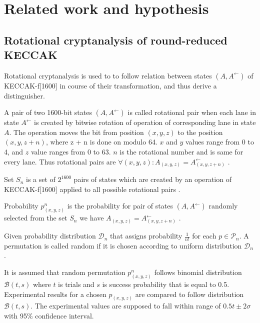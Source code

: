 \chapter{Related work and hypothesis}

\section{Rotational cryptanalysis of round-reduced KECCAK}

Rotational cryptanalysis\cite{00041} is used to to follow relation between states $(A, A^{\leftarrow})$ of 
KECCAK-f[1600] in course of their transformation, and thus derive a distinguisher.

\begin{defn}
A pair of two 1600-bit states $(A, A^{\leftarrow})$ is called rotational pair when each lane in state $A^{\leftarrow}$
is created by bitwise rotation of operation of corresponding lane in state $A$. The operation moves the bit from 
position $(x, y, z)$ to the position $(x, y, z + n)$, where z + n is done on modulo 64. $x$ and $y$ values range from 0 
to 4, and $z$ value ranges from 0 to 63. $n$ is the rotational number and is same for every lane. Thus rotational pairs
are $\forall(x, y, z) : A_{(x, y, z)} = A^{\leftarrow}_{(x, y, z + n)}$ \cite{00022}.
\end{defn}

\begin{defn}
Set $S_n$ is a set of $2^{1600}$ pairs of states which are created by an operation of KECCAK-f[1600] applied to all
possible rotational pairs \cite{00022}.
\end{defn}

\begin{defn}
Probability $p^{n}_{(x, y, z)}$ is the probability for pair of states $(A, A^{\leftarrow})$ randomly selected from the
set $S_n$ we have $A_{(x, y, z)} = A^{\leftarrow}_{(x, y, z + n)}$ \cite{00022}.
\end{defn}

\begin{defn}
Given probability distribution $\mathcal{D}_n$ that assigns probability $\frac{1}{n!}$ for each $p \in \mathcal{P}_n$.
A permutation is called random if it is chosen according to uniform distribution $\mathcal{D}_n$ \cite{00022}.
\end{defn}

It is assumed that random permutation $p^n_{(x, y, z)}$ follows binomial distribution $\mathcal{B}(t, s)$ where $t$ is
trials and $s$ is success probability that is equal to 0.5. Experimental results for a chosen $p_{(x, y, z)}$ are 
compared to follow distribution $\mathcal{B}(t, s)$. The experimental values are supposed to fall within range of 
$0.5t\pm2\sigma$ with 95\% confidence interval.

